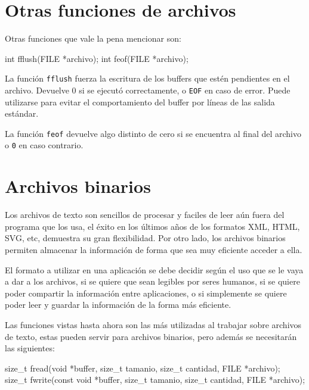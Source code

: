 \section{Otras funciones de archivos}

Otras funciones que vale la pena mencionar son:

\begin{codigo-c-plano}
int fflush(FILE *archivo);
int feof(FILE *archivo);
\end{codigo-c-plano}

La función \lstinline!fflush! fuerza la escritura de los buffers que estén
pendientes en el archivo. Devuelve 0 si se ejecutó correctamente, o
\lstinline!EOF! en caso de error. Puede utilizarse para evitar el
comportamiento del buffer por líneas de las salida estándar.

La función \lstinline!feof! devuelve algo distinto de cero si se encuentra al
final del archivo o \lstinline!0! en caso contrario.

\section{Archivos binarios}

Los archivos de texto son sencillos de procesar y faciles de leer aún fuera
del programa que los usa, el éxito en los últimos años de los formatos XML,
HTML, SVG, etc, demuestra su gran flexibilidad. Por otro lado, los archivos
binarios permiten almacenar la información de forma que sea muy eficiente
acceder a ella.

El formato a utilizar en una aplicación se debe decidir según el uso que se le
vaya a dar a los archivos, si se quiere que sean legibles por seres humanos,
si se quiere poder compartir la información entre aplicaciones, o si
simplemente se quiere poder leer y guardar la información de la forma más
eficiente.


Las funciones vistas hasta ahora son las más utilizadas al trabajar sobre
archivos de texto, estas pueden servir para archivos binarios, pero además se
necesitarán las siguientes:

\begin{codigo-c-plano}
size_t fread(void *buffer, size_t tamanio, size_t cantidad, FILE *archivo);
size_t fwrite(const void *buffer, size_t tamanio, size_t cantidad,
              FILE *archivo);
\end{codigo-c-plano}


